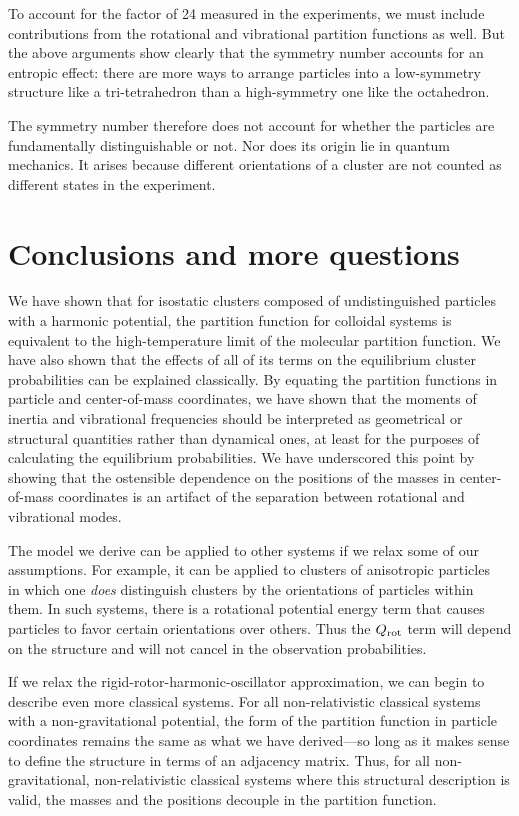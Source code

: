 \documentclass[pre, aps, twocolumn, reprint, amsmath,amssymb, showpacs,
superscriptaddress] {revtex4-1}
\begin{document}
To account for the factor of 24 measured in the experiments, we must
include contributions from the rotational and vibrational partition
functions as well. But the above arguments show clearly that the
symmetry number accounts for an entropic effect: there are more ways to
arrange particles into a low-symmetry structure like a tri-tetrahedron
than a high-symmetry one like the octahedron.

The symmetry number therefore does not account for whether the particles
are fundamentally distinguishable or not. Nor does its origin lie in
quantum mechanics. It arises because different orientations of a cluster
are not counted as different states in the experiment.

\section{Conclusions and more questions}

We have shown that for isostatic clusters composed of undistinguished
particles with a harmonic potential, the partition function for
colloidal systems is equivalent to the high-temperature limit of the
molecular partition function. We have also shown that the effects of all
of its terms on the equilibrium cluster probabilities can be explained
classically. By equating the partition functions in particle and
center-of-mass coordinates, we have shown that the moments of inertia
and vibrational frequencies should be interpreted as geometrical or
structural quantities rather than dynamical ones, at least for the
purposes of calculating the equilibrium probabilities. We have
underscored this point by showing that the ostensible dependence on the
positions of the masses in center-of-mass coordinates is an artifact of
the separation between rotational and vibrational modes.

The model we derive can be applied to other systems if we relax some of
our assumptions. For example, it can be applied to clusters of
anisotropic particles~\cite{hong_clusters_2008, chen11a} in which one
\emph{does} distinguish clusters by the orientations of particles within
them. In such systems, there is a rotational potential energy term that
causes particles to favor certain orientations over others. Thus the
$Q_\textnormal{rot}$ term will depend on the structure and will not
cancel in the observation probabilities.

If we relax the rigid-rotor-harmonic-oscillator approximation, we can
begin to describe even more classical systems. For all non-relativistic
classical systems with a non-gravitational potential, the form of the
partition function in particle coordinates remains the same as what we
have derived---so long as it makes sense to define the structure in
terms of an adjacency matrix. Thus, for all non-gravitational,
non-relativistic classical systems where this structural description is
valid, the masses and the positions decouple in the partition function.
\end{document}
